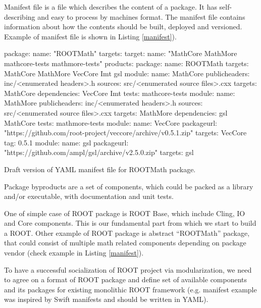 \documentclass{webofc}
\begin{document}
Manifest file is a file which describes the content of a package. It has self-describing and easy to process by machines format. The manifest file contains information about how the contents should be built, deployed and versioned. Example of manifest file is shown in Listing \ref{manifest}).

\begin{listing}[h]
    \noindent
    \begin{minipage}[h]{.7\textwidth}
   \begin{cppcode*}{}
package:
  name: "ROOTMath"
  targets:
    target:
    name: "MathCore MathMore mathcore-tests mathmore-tests"
  products:
    package:
    name: ROOTMath
    targets: MathCore MathMore VecCore Imt gsl
  module:
    name: MathCore
    publicheaders: inc/<enumerated headers>.h
    sources: src/<enumerated source files>.cxx
    targets: MathCore
    dependencies: VecCore Imt
    tests: mathcore-tests
  module:
    name: MathMore
    publicheaders: inc/<enumerated headers>.h
    sources: src/<enumerated source files>.cxx
    targets: MathMore
    dependencies: gsl MathCore
    tests: mathmore-tests
  module:
    name: VecCore
    packageurl: "https://github.com/root-project/veccore/archive/v0.5.1.zip"
    targets: VecCore
    tag: 0.5.1
  module:
    name: gsl
    packageurl: "https://github.com/ampl/gsl/archive/v2.5.0.zip"
    targets: gsl
   \end{cppcode*}
   \end{minipage}
   \caption{Draft version of YAML manifest file for ROOTMath package.}
   \label{manifest}
\end{listing}

Package byproducts are a set of components, which could be packed as a library and/or executable, with documentation and unit tests.

One of simple case of ROOT package is ROOT Base, which include Cling, IO and Core components. This is our fundamental part from which we start to build a ROOT. Other example of ROOT package is abstract “ROOTMath” package, that could consist of multiple math related components depending on package vendor (check example in Listing \ref{manifest}).

To have a successful socialization of ROOT project via modularization, we need to agree on a format of ROOT package and define set of available components and its packages for existing monolithic ROOT framework (e.g. manifest example was inspired by Swift manifests \cite{swift} and should be written in YAML).
\end{document}
